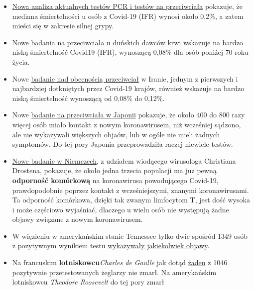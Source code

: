 \begin{itemize}
\tightlist
\item
  \href{https://swprs.org/studies-on-covid-19-lethality/}{Nowa analiza
  aktualnych testów PCR i testów na przeciwciała} pokazuje, że mediana
  śmiertelności u osób z Covid-19 (IFR) wynosi około 0,2\%, a zatem
  mieści się w zakresie silnej grypy.
\item
  Nowe
  \href{https://www.medrxiv.org/content/10.1101/2020.04.24.20075291v1}{badania
  na przeciwciała u duńskich dawców krwi} wskazuje na bardzo niską
  śmiertelność Covid19 (IFR), wynoszącą 0,08\% dla osób poniżej 70 roku
  życia.
\item
  Nowe
  \href{https://www.medrxiv.org/content/10.1101/2020.04.26.20079244v1}{badanie
  nad obecnością przeciwciał} w Iranie, jednym z pierwszych i
  najbardziej dotkniętych przez Covid-19 krajów, również wskazuje na
  bardzo niską śmiertelność wynoszącą od 0,08\% do 0,12\%.
\item
  Nowe
  \href{https://www.medrxiv.org/content/10.1101/2020.04.26.20079822v1}{badanie
  na przeciwciała w Japonii} pokazuje, że około 400 do 800 razy więcej
  osób miało kontakt z nowym koronawirusem, niż wcześniej sądzono, ale
  nie wykazywali większych objaów, lub w ogóle nie mieli żadnych
  symptomów. Do tej pory Japonia przeprowadziła raczej niewiele testów.
\item
  \href{https://www.medrxiv.org/content/10.1101/2020.04.17.20061440v1}{Nowe
  badanie w Niemczech}, z udziałem wiodącego wirusologa Christiana
  Drostena, pokazuje, że około jedna trzecia populacji ma już pewną
  \textbf{odporność komórkową} na koronawirusa powodującego Covid-19,
  prawdopodobnie poprzez kontakt z wcześniejszymi, znanymi
  koronawirusami. Ta odporność komórkowa, dzięki tak zwanym limfocytom
  T, jest dość wysoka i może częściowo wyjaśniać, dlaczego u wielu osób
  nie występują żadne objawy związane z nowym koronawirusem.
\item
  W więzieniu w amerykańskim stanie Tennessee tylko dwie spośród 1349
  osób z pozytywnym wynikiem testu
  \href{https://www.tennessean.com/story/news/politics/2020/05/01/tennessee-testing-all-inmates-prison-staff-after-multiple-outbreaks/3067388001/}{wykazywały
  jakiekolwiek objawy}.
\item
  Na francuskim \textbf{lotniskowcu}\emph{Charles de Gaulle} jak dotąd
  \href{https://en.wikipedia.org/wiki/COVID-19_pandemic_on_Charles_de_Gaulle}{żaden}
  z 1046 pozytywnie przetestowanych żeglarzy nie zmarł. Na amerykańskim
  lotniskowcu \emph{Theodore Roosevelt} do tej pory zmarł

\end{itemize}
